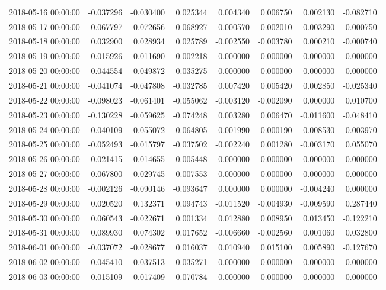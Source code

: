 \begin{tabular}{lrrrrrrr}
2018-05-16 00:00:00 & -0.037296 & -0.030400 & 0.025344 & 0.004340 & 0.006750 & 0.002130 & -0.082710 \\
2018-05-17 00:00:00 & -0.067797 & -0.072656 & -0.068927 & -0.000570 & -0.002010 & 0.003290 & 0.000750 \\
2018-05-18 00:00:00 & 0.032900 & 0.028934 & 0.025789 & -0.002550 & -0.003780 & 0.000210 & -0.000740 \\
2018-05-19 00:00:00 & 0.015926 & -0.011690 & -0.002218 & 0.000000 & 0.000000 & 0.000000 & 0.000000 \\
2018-05-20 00:00:00 & 0.044554 & 0.049872 & 0.035275 & 0.000000 & 0.000000 & 0.000000 & 0.000000 \\
2018-05-21 00:00:00 & -0.041074 & -0.047808 & -0.032785 & 0.007420 & 0.005420 & 0.002850 & -0.025340 \\
2018-05-22 00:00:00 & -0.098023 & -0.061401 & -0.055062 & -0.003120 & -0.002090 & 0.000000 & 0.010700 \\
2018-05-23 00:00:00 & -0.130228 & -0.059625 & -0.074248 & 0.003280 & 0.006470 & -0.011600 & -0.048410 \\
2018-05-24 00:00:00 & 0.040109 & 0.055072 & 0.064805 & -0.001990 & -0.000190 & 0.008530 & -0.003970 \\
2018-05-25 00:00:00 & -0.052493 & -0.015797 & -0.037502 & -0.002240 & 0.001280 & -0.003170 & 0.055070 \\
2018-05-26 00:00:00 & 0.021415 & -0.014655 & 0.005448 & 0.000000 & 0.000000 & 0.000000 & 0.000000 \\
2018-05-27 00:00:00 & -0.067800 & -0.029745 & -0.007553 & 0.000000 & 0.000000 & 0.000000 & 0.000000 \\
2018-05-28 00:00:00 & -0.002126 & -0.090146 & -0.093647 & 0.000000 & 0.000000 & -0.004240 & 0.000000 \\
2018-05-29 00:00:00 & 0.020520 & 0.132371 & 0.094743 & -0.011520 & -0.004930 & -0.009590 & 0.287440 \\
2018-05-30 00:00:00 & 0.060543 & -0.022671 & 0.001334 & 0.012880 & 0.008950 & 0.013450 & -0.122210 \\
2018-05-31 00:00:00 & 0.089930 & 0.074302 & 0.017652 & -0.006660 & -0.002560 & 0.001060 & 0.032800 \\
2018-06-01 00:00:00 & -0.037072 & -0.028677 & 0.016037 & 0.010940 & 0.015100 & 0.005890 & -0.127670 \\
2018-06-02 00:00:00 & 0.045410 & 0.037513 & 0.035271 & 0.000000 & 0.000000 & 0.000000 & 0.000000 \\
2018-06-03 00:00:00 & 0.015109 & 0.017409 & 0.070784 & 0.000000 & 0.000000 & 0.000000 & 0.000000 \\

\end{tabular}
